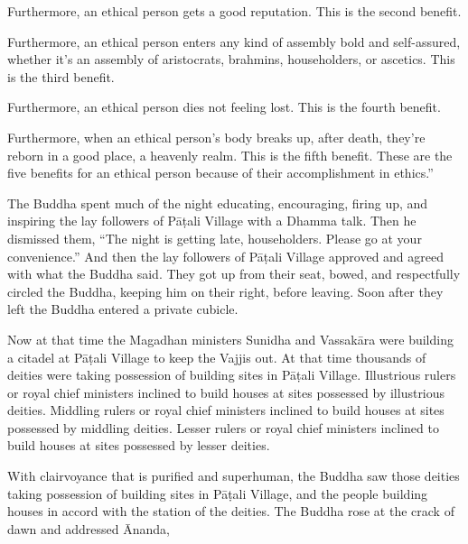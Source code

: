 \documentclass[12pt,openany]{book}%
\begin{document}
Furthermore, an ethical person gets a good reputation. This is the second benefit. 

Furthermore, an ethical person enters any kind of assembly bold and self-assured, whether it’s an assembly of aristocrats, brahmins, householders, or ascetics. This is the third benefit. 

Furthermore, an ethical person dies not feeling lost. This is the fourth benefit. 

Furthermore, when an ethical person’s body breaks up, after death, they’re reborn in a good place, a heavenly realm. This is the fifth benefit. These are the five benefits for an ethical person because of their accomplishment in ethics.” 

The Buddha spent much of the night educating, encouraging, firing up, and inspiring the lay followers of \textsanskrit{Pāṭali} Village with a Dhamma talk. Then he dismissed them, “The night is getting late, householders. Please go at your convenience.” And then the lay followers of \textsanskrit{Pāṭali} Village approved and agreed with what the Buddha said. They got up from their seat, bowed, and respectfully circled the Buddha, keeping him on their right, before leaving. Soon after they left the Buddha entered a private cubicle. 

Now at that time the Magadhan ministers Sunidha and \textsanskrit{Vassakāra} were building a citadel at \textsanskrit{Pāṭali} Village to keep the Vajjis out. At that time thousands of deities were taking possession of building sites in \textsanskrit{Pāṭali} Village. Illustrious rulers or royal chief ministers inclined to build houses at sites possessed by illustrious deities. Middling rulers or royal chief ministers inclined to build houses at sites possessed by middling deities. Lesser rulers or royal chief ministers inclined to build houses at sites possessed by lesser deities. 

With clairvoyance that is purified and superhuman, the Buddha saw those deities taking possession of building sites in \textsanskrit{Pāṭali} Village, and the people building houses in accord with the station of the deities. The Buddha rose at the crack of dawn and addressed Ānanda, 
\end{document}
